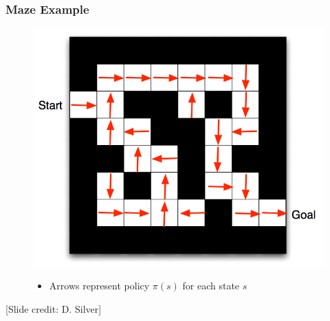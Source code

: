 \documentclass{beamer}
\begin{document}
\begin{frame}\frametitle{Maze Example}\small
\begin{figure}
\begin{minipage}{0.5\linewidth}
\includegraphics[width=\linewidth]{Figures/maze2}
\end{minipage}
\hspace{3mm}
\begin{minipage}{0.45\linewidth}
\begin{itemize}
\item Arrows represent policy $\pi(s)$ for each state $s$
\end{itemize}
\end{minipage}
\end{figure}

\vspace{14mm}
\scriptsize [Slide credit: D. Silver]
\end{frame}
\end{document}
